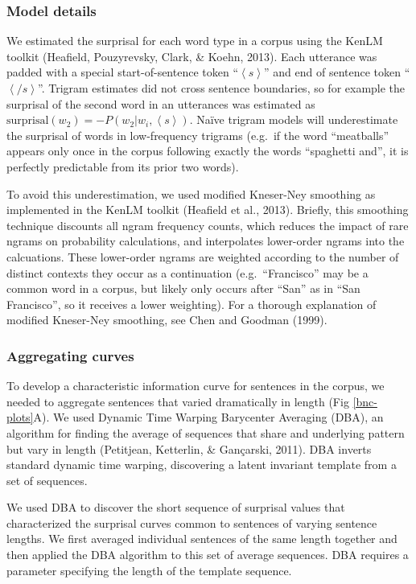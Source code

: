 \documentclass[
  english,
  man,floatsintext]{apa6}
\begin{document}
\hypertarget{model-details}{%
\subsubsection{Model details}\label{model-details}}

We estimated the surprisal for each word type in a corpus using the KenLM toolkit (Heafield, Pouzyrevsky, Clark, \& Koehn, 2013). Each utterance was padded with a special start-of-sentence token ``\(\left<s\right>\)'' and end of sentence token ``\(\left</s\right>\)''. Trigram estimates did not cross sentence boundaries, so for example the surprisal of the second word in an utterances was estimated as \(\text{surprisal}(w_{2}) = -P(w_2|w_{i},\left<s\right>)\). Naïve trigram models will underestimate the surprisal of words in low-frequency trigrams (e.g.~if the word ``meatballs'' appears only once in the corpus following exactly the words ``spaghetti and'', it is perfectly predictable from its prior two words).

To avoid this underestimation, we used modified Kneser-Ney smoothing as implemented in the KenLM toolkit (Heafield et al., 2013). Briefly, this smoothing technique discounts all ngram frequency counts, which reduces the impact of rare ngrams on probability calculations, and interpolates lower-order ngrams into the calcuations. These lower-order ngrams are weighted according to the number of distinct contexts they occur as a continuation (e.g.~``Francisco'' may be a common word in a corpus, but likely only occurs after ``San'' as in ``San Francisco'', so it receives a lower weighting). For a thorough explanation of modified Kneser-Ney smoothing, see Chen and Goodman (1999).

\hypertarget{aggregating-curves}{%
\subsubsection{Aggregating curves}\label{aggregating-curves}}

To develop a characteristic information curve for sentences in the corpus, we needed to aggregate sentences that varied dramatically in length (Fig \ref{bnc-plots}A). We used Dynamic Time Warping Barycenter Averaging (DBA), an algorithm for finding the average of sequences that share and underlying pattern but vary in length (Petitjean, Ketterlin, \& Gançarski, 2011). DBA inverts standard dynamic time warping, discovering a latent invariant template from a set of sequences.

We used DBA to discover the short sequence of surprisal values that characterized the surprisal curves common to sentences of varying sentence lengths. We first averaged individual sentences of the same length together and then applied the DBA algorithm to this set of average sequences. DBA requires a parameter specifying the length of the template sequence.
\end{document}
